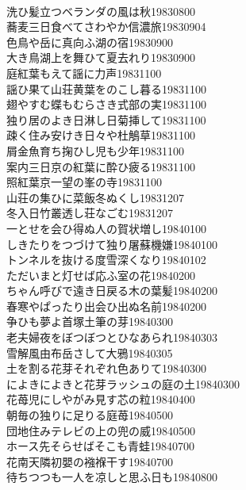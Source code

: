 \begin{multicols}{2}
\\洗ひ髪立つベランダの風は秋\hfill{19830800}
\\蕎麦三日食べてさわやか信濃旅\hfill{19830904}
\\色鳥や岳に真向ふ湖の宿\hfill{19830900}
\\大き鳥湖上を舞ひて夏去れり\hfill{19830900}
\\庭紅葉もえて謡に力声\hfill{19831100}
\\謡ひ果て山荘黄葉をのこし暮る\hfill{19831100}
\\翅やすむ蝶もむらさき式部の実\hfill{19831100}
\\独り居のよき日淋し日菊挿して\hfill{19831100}
\\疎く住み安けき日々や杜鵤草\hfill{19831100}
\\屑金魚育ち掬ひし児も少年\hfill{19831100}
\\案内三日京の紅葉に酔ひ疲る\hfill{19831100}
\\照紅葉京一望の峯の寺\hfill{19831100}
\\山荘の集ひに菜飯冬ぬくし\hfill{19831207}
\\冬入日竹叢透し荘なごむ\hfill{19831207}
\\一とせを会ひ得ぬ人の賀状増し\hfill{19840100}
\\しきたりをつづけて独り屠蘇機嫌\hfill{19840100}
\\トンネルを抜ける度雪深くなり\hfill{19840102}
\\ただいまと灯せば応ふ室の花\hfill{19840200}
\\ちゃん呼びで遠き日戻る木の葉髪\hfill{19840200}
\\春寒やぱったり出会ひ出ぬ名前\hfill{19840200}
\\争ひも夢よ首塚土筆の芽\hfill{19840300}
\\老夫婦夜をぼつぼつとひなあられ\hfill{19840303}
\\雪解風由布岳さして大鴉\hfill{19840305}
\\土を割る花芽それぞれ色ありて\hfill{19840300}
\\によきによきと花芽ラッシュの庭の土\hfill{19840300}
\\花苺児にしやがみ見す芯の粒\hfill{19840400}
\\朝毎の独りに足りる庭苺\hfill{19840500}
\\団地住みテレビの上の兜の威\hfill{19840500}
\\ホース先そらせばそこも青蛙\hfill{19840700}
\\花南天隣初嬰の襁褓干す\hfill{19840700}
\\待ちつつも一人を凉しと思ふ日も\hfill{19840800}

\end{multicols}
